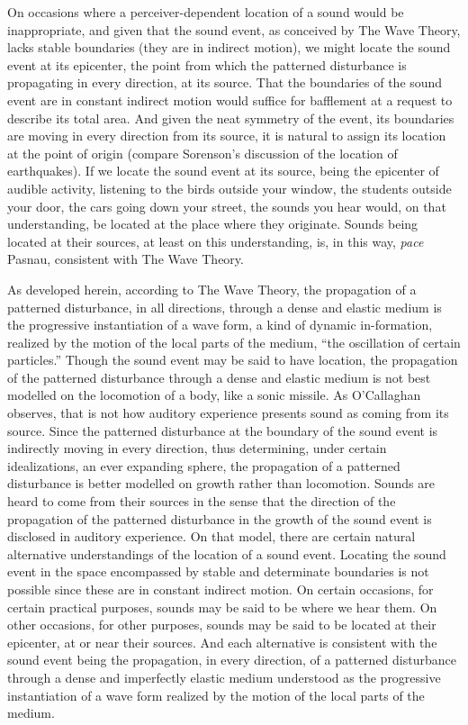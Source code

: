 On occasions where a perceiver-dependent location of a sound would be inappropriate, and given that the sound event, as conceived by The Wave Theory, lacks stable boundaries (they are in indirect motion), we might locate the sound event at its epicenter, the point from which the patterned disturbance is propagating in every direction, at its source. That the boundaries of the sound event are in constant indirect motion would suffice for bafflement at a request to describe its total area. And given the neat symmetry of the event, its boundaries are moving in every direction from its source, it is natural to assign its location at the point of origin (compare Sorenson's \citeyear[138--9]{Sorensen:2009aa} discussion of the location of earthquakes). If we locate the sound event at its source, being the epicenter of audible activity, listening to the birds outside your window, the students outside your door, the cars going down your street, the sounds you hear would, on that understanding, be located at the place where they originate. Sounds being located at their sources, at least on this understanding, is, in this way, \emph{pace} Pasnau, consistent with The Wave Theory.

As developed herein, according to The Wave Theory, the propagation of a patterned disturbance, in all directions, through a dense and elastic medium is the progressive instantiation of a wave form, a kind of dynamic in-formation, realized by the motion of the local parts of the medium, ``the oscillation of certain particles.'' Though the sound event may be said to have location, the propagation of the patterned disturbance through a dense and elastic medium is not best modelled on the locomotion of a body, like a sonic missile. As O'Callaghan observes, that is not how auditory experience presents sound as coming from its source.  Since the patterned disturbance at the boundary of the sound event is indirectly moving in every direction, thus determining, under certain idealizations, an ever expanding sphere, the propagation of a patterned disturbance is better modelled on growth rather than locomotion. Sounds are heard to come from their sources in the sense that the direction of the propagation of the patterned disturbance in the growth of the sound event is disclosed in auditory experience. On that model, there are certain natural alternative understandings of the location of a sound event. Locating the sound event in the space encompassed by stable and determinate boundaries is not possible since these are in constant indirect motion. On certain occasions, for certain practical purposes, sounds may be said to be where we hear them. On other occasions, for other purposes, sounds may be said to be located at their epicenter, at or near their sources. And each alternative is consistent with the sound event being the propagation, in every direction, of a patterned disturbance through a dense and imperfectly elastic medium understood as the progressive instantiation of a wave form realized by the motion of the local parts of the medium. 


